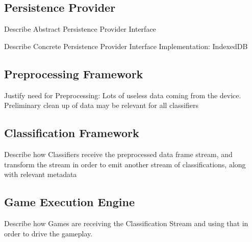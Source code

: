 \subsection{Persistence Provider}
Describe Abstract Persistence Provider Interface

Describe Concrete Persistence Provider Interface Implementation: IndexedDB
\subsection{Preprocessing Framework}
Justify need for Preprocessing: Lots of useless data coming from the device. Preliminary
clean up of data may be relevant for all classifiers
\subsection{Classification Framework}
Describe how Classifiers receive the preprocessed data frame stream, and transform the stream in order to emit another stream of classifications, along with relevant metadata
\subsection{Game Execution Engine}
Describe how Games are receiving the Classification Stream and using that in order to drive the gameplay.

